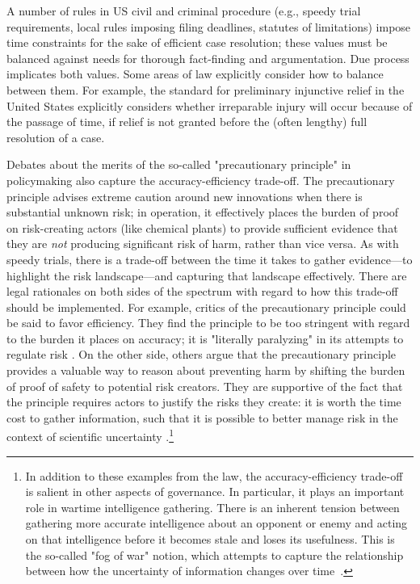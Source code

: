 \documentclass[sigplan,screen]{acmart}
\begin{document}
A number of rules in US civil and criminal procedure (e.g., speedy trial requirements, local rules imposing filing deadlines, statutes of limitations) impose time constraints for the sake of efficient case resolution; these values must be balanced against needs for thorough fact-finding and argumentation. Due process implicates both values. Some areas of law explicitly consider how to balance between them. For example, the standard for preliminary injunctive relief in the United States explicitly considers whether irreparable injury will occur because of the passage of time, if relief is not granted before the (often lengthy) full resolution of a case.

Debates about the merits of the so-called "precautionary principle" in policymaking also capture the accuracy-efficiency trade-off. The precautionary principle advises extreme caution around new innovations when there is substantial unknown risk; in operation, it effectively places the burden of proof on risk-creating actors (like chemical plants) to provide sufficient evidence that they are \emph{not} producing significant risk of harm, rather than vice versa. As with speedy trials, there is a trade-off between the time it takes to gather evidence---to highlight the risk landscape---and capturing that landscape effectively. There are legal rationales on both sides of the spectrum with regard to how this trade-off should be implemented. For example, critics of the precautionary principle could be said to favor efficiency. They find the principle to be too stringent with regard to the burden it places on accuracy; it is "literally paralyzing" in its attempts to regulate risk  \cite{sunstein2003precaution}. On the other side, others argue that the precautionary principle provides a valuable way to reason about preventing harm by shifting the burden of proof of safety to potential risk creators. They are supportive of the fact that the principle requires actors to justify the risks they create: it is worth the time cost to gather information, such that it is possible to better manage risk in the context of scientific uncertainty \cite{sachs2011precaution}.\footnote{In addition to these examples from the law, the accuracy-efficiency trade-off is salient in other aspects of governance. In particular, it plays an important role in wartime intelligence gathering. There is an inherent tension between gathering more accurate intelligence about an opponent or enemy and acting on that intelligence before it becomes stale and loses its usefulness. This is the so-called "fog of war" notion, which attempts to capture the relationship between how the uncertainty of information changes over time~\cite{Clausewitz1832fog}.}
\end{document}
